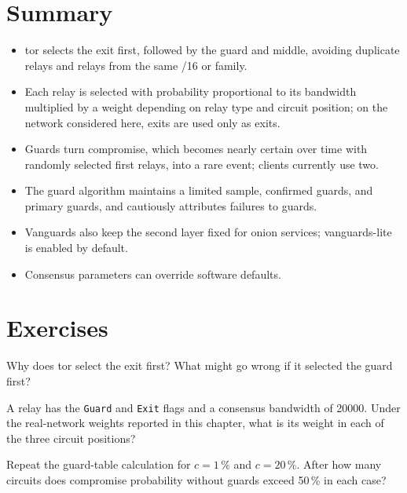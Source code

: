 \section*{Summary}
\begin{itemize}
  \item tor selects the exit first, followed by the guard and middle, avoiding duplicate relays and relays from the same /16 or family.
  \item Each relay is selected with probability proportional to its bandwidth multiplied by a weight depending on relay type and circuit position; on the network considered here, exits are used only as exits.
  \item Guards turn compromise, which becomes nearly certain over time with randomly selected first relays, into a rare event; clients currently use two.
  \item The guard algorithm maintains a limited sample, confirmed guards, and primary guards, and cautiously attributes failures to guards.
  \item Vanguards also keep the second layer fixed for onion services; vanguards-lite is enabled by default.
  \item Consensus parameters can override software defaults.
\end{itemize}

\section*{Exercises}

\begin{esercizio}[1]\label{es:13-ordine}
Why does tor select the exit first? What might go wrong if it selected the guard first?
\end{esercizio}

\begin{esercizio}[1]\label{es:13-peso}
A relay has the \texttt{Guard} and \texttt{Exit} flags and a consensus bandwidth of 20000. Under the real-network weights reported in this chapter, what is its weight in each of the three circuit positions?
\end{esercizio}

\begin{esercizio}[2]\label{es:13-guard}
Repeat the guard-table calculation for $c = 1\,\%$ and $c = 20\,\%$. After how many circuits does compromise probability without guards exceed 50\,\% in each case?
\end{esercizio}

